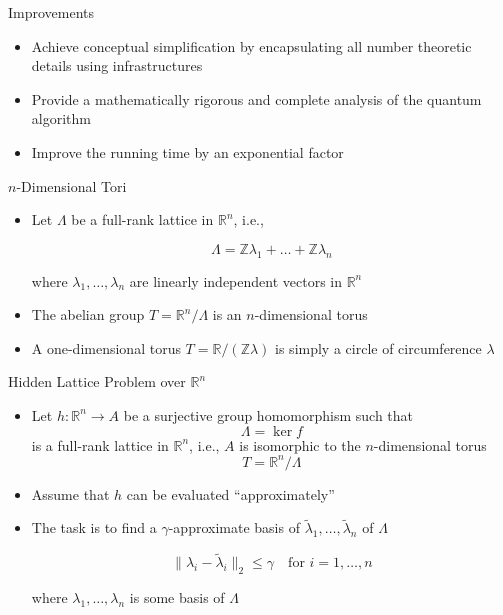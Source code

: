 \documentclass{beamer}
\newcommand{\R}{\mathbb{R}}
\newcommand{\Z}{\mathbb{Z}}
\renewcommand{\>}{\rangle}
\newcommand{\<}{\langle}
\begin{document}
\begin{frame}{Improvements}

\begin{itemize}
\item Achieve conceptual simplification by encapsulating all number theoretic details using infrastructures

\medskip
\item Provide a mathematically rigorous and complete analysis of the quantum algorithm

\medskip
\item Improve the running time by an exponential factor
\end{itemize}

\end{frame}


\begin{frame}{$n$-Dimensional Tori}

\begin{itemize}
\item Let $\Lambda$ be a full-rank lattice in $\R^n$, i.e.,

\[
\Lambda = \Z \lambda_1 + \ldots + \Z \lambda_n
\]

where $\lambda_1,\ldots,\lambda_n$ are linearly independent vectors in $\R^n$

\bigskip
\item The abelian group $T=\R^n/\Lambda$ is an $n$-dimensional torus

\bigskip
\item A one-dimensional torus $T=\R / (\Z \lambda)$ is simply a circle of circumference $\lambda$
\end{itemize}

\end{frame}


\begin{frame}{Hidden Lattice Problem over $\R^n$}

\begin{itemize}
\item Let $h : \R^n \rightarrow A$ be a surjective group homomorphism such that 
\[
\Lambda = \ker f
\] 
is a full-rank lattice in $\R^n$, i.e., $A$ is isomorphic to the $n$-dimensional torus 
\[
T=\R^n/\Lambda
\]

\medskip
\item Assume that $h$ can be evaluated ``approximately''

\medskip
\item The task is to find a $\gamma$-approximate basis of $\tilde{\lambda}_1,\ldots,\tilde{\lambda}_n$ of $\Lambda$

\[
\| \lambda_i - \tilde{\lambda}_i \|_2 \le \gamma \quad\mbox{for $i=1,\ldots,n$}
\]

\medskip
where $\lambda_1,\ldots,\lambda_n$ is some basis of $\Lambda$
\end{itemize}

\end{frame}
\end{document}
